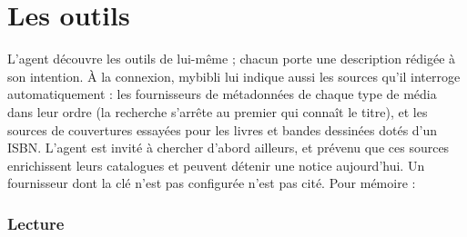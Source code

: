 \section{Les outils}
\label{sec:agents-tools}

L'agent découvre les outils de lui-même ; chacun porte une
description rédigée à son intention. À la connexion, mybibli lui
indique aussi les sources qu'il interroge automatiquement : les
fournisseurs de métadonnées de chaque type de média dans leur ordre (la
recherche s'arrête au premier qui connaît le titre), et les sources de
couvertures essayées pour les livres et bandes dessinées dotés d'un
ISBN. L'agent est invité à chercher d'abord ailleurs, et prévenu que
ces sources enrichissent leurs catalogues et peuvent détenir une notice
aujourd'hui. Un fournisseur dont la clé
n'est pas configurée n'est pas cité. Pour mémoire :

\subsubsection*{Lecture}

